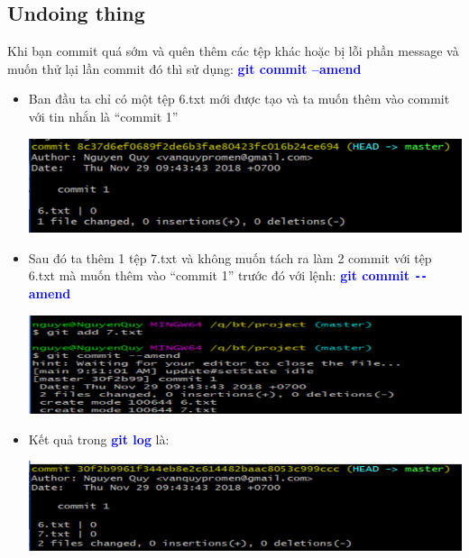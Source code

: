 \documentclass[12pt,a4paper]{report}
\begin{document}
\subsection{Undoing thing}
Khi bạn commit quá sớm và quên thêm các tệp khác hoặc bị lỗi phần message và muốn thử lại lần commit đó thì sử dụng: \textcolor{blue}{\bf git commit –amend}
\begin{itemize}
\item Ban đầu ta chỉ có một tệp 6.txt mới được tạo và ta muốn thêm vào commit với tin nhắn là “commit 1”

	\includegraphics[width=0.8\linewidth]{screenshot026}

	\label{fig:screenshot026}

\item Sau đó ta thêm 1 tệp 7.txt và không muốn tách ra làm 2 commit với tệp 6.txt mà muốn thêm vào “commit 1” trước đó với lệnh: \textcolor{blue}{\bf git commit \texttt{-{}-}amend}

	\includegraphics[width=0.8\linewidth]{screenshot027}

	\label{fig:screenshot027}

\item Kết quả trong \textcolor{blue}{\bf git log} là:

	\includegraphics[width=0.8\linewidth]{screenshot028}
	
	\label{fig:screenshot028}
\end{itemize}
\end{document}
